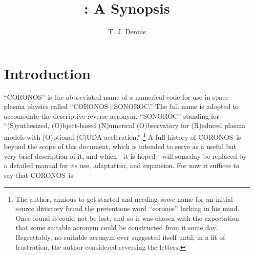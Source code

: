 \documentclass[12pt]{memoir}
\title{\textsf{\coronos}: A Synopsis}
\author{T. J. Dennis}
\newcommand{\coronos}{\textsf{CORONOS}}
\newcommand{\sonoroc}{\textsf{SONOROC}}
\begin{document}
%
\maketitle
\section{Introduction}
\label{sec:intro}
%
``\coronos'' is the abbreviated name of a numerical code for use in space
plasma physics called  ``\coronos$\,||\,$\sonoroc.'' The full name is
adopted to accomodate the descriptive reverse acronym, ``\sonoroc''
standing for ``(S)ynthesized, (O)bject-based (N)umerical (O)bservatory for
(R)educed \newline plasma models with (O)ptional (C)UDA-accleration.''
\footnote{The author, anxious to get started and needing {\em some} name
for an initial source directory found the pretentious word ``coronos''
lurking in his mind. Once found it could not be lost, and so it was chosen
with the expectation that some suitable acronym could be constructed from 
it some day. Regrettably, no suitable acronym ever suggested itself until,
in a fit of frustration, the author considered reversing the letters.}
%
A full history of \coronos\ is beyond the scope of this document, which is
intended to serve as a useful but very brief description of it, and which---it
is hoped---will someday be replaced by a detailed manual for its use,
adaptation, and expansion. For now it suffices to say that \coronos\ is
%
\end{document}
